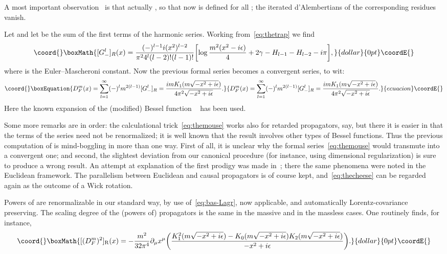 \documentclass[a4paper,12pt]{article}
\renewcommand{\a}{\alpha}          %
\providecommand{\del}{\partial}        %
\providecommand{\dl}{\delta}           %
\providecommand{\eps}{\epsilon}        %
\providecommand{\ga}{\gamma}           %
\providecommand{\7}{\dagger}           %
\theoremstyle{plain}
\theoremstyle{definition}
\begin{document}
A most important observation~\cite{ThreeFromBA} is that actually
\myHighlight{$\square^l[G^l_-]_{\rm R}=\dl$}\coordHE{}, so that now \myHighlight{$\square^\a$}\coordHE{} is defined
for all \myHighlight{$\a$}\coordHE{}; the iterated d'Alembertians of the corresponding
residues vanish.

Let \coordHE{} and let \coordHE{} be the sum of the \coordHE{} first terms of the
harmonic series. Working from~\eqref{eq:thetrap} we find
$$\coord{}\boxMath{
[G^l_-]_R(x) = \frac{(-)^{l-1}i(x^2)^{l-2}}{\pi^2 4^l(l-2)!(l-1)!}
\biggl[\log\frac{m^2(x^2-i\eps)}{4} + 2\ga -
H_{l-1} -  H_{l-2} - i\pi\biggr],
}{dollar}{0pt}\coordE{}$$
where \myHighlight{$\ga$}\coordHE{} is the Euler--Mascheroni constant. Now the previous formal
series becomes a convergent series, to wit:
\begin{equation}\coord{}\boxEquation{
D^m_F(x) = \sum_{l=1}^\infty(-)^lm^{2(l-1)}[G^l_-]_R =
\frac{imK_1(m\sqrt{-x^2+i\eps})}{4\pi^2\sqrt{-x^2+i\eps}}.
\label{eq:thecheese}
}{
D^m_F(x) = \sum_{l=1}^\infty(-)^lm^{2(l-1)}[G^l_-]_R =
\frac{imK_1(m\sqrt{-x^2+i\eps})}{4\pi^2\sqrt{-x^2+i\eps}}.
}{ecuacion}\coordE{}\end{equation}
Here the known expansion of the (modified) Bessel function
\coordHE{}~\cite{AS} has been used.

Some more remarks are in order: the calculational
trick~\eqref{eq:themouse} works also for retarded propagators, say,
but there it is easier in that the terms of the series need not be
renormalized; it is well known that the result involves other types of
Bessel functions. Thus the previous computation of \coordHE{} is
mind-boggling in more than one way. First of all, it is unclear
why the formal series~\eqref{eq:themouse} would transmute into a
convergent one; and second, the slightest deviation from our canonical
procedure (for instance, using dimensional regularization) is sure to
produce a wrong result. An attempt at explanation of the first prodigy
was made in~\cite{Natural}; there the same phenomena were noted in the
Euclidean framework. The parallelism between Euclidean and causal
propagators is of course kept, and~\eqref{eq:thecheese} can be
regarded again as the outcome of a Wick rotation.

\smallskip

Powers of \coordHE{} are renormalizable in our standard way, by use
of~\eqref{eq:bas-Lagr}, now applicable, and automatically
Lorentz-covariance preserving. The scaling degree of the (powers of)
propagators is the same in the massive and in the massless cases. One
routinely finds, for instance,
$$\coord{}\boxMath{
[(D^m_F)^2]_{\rm R}(x) =
-\frac{m^2}{32\pi^4} \del_\mu x^\mu \biggl(
\frac{K_1^2(m\sqrt{-x^2+i\eps})-K_0(m\sqrt{-x^2+i\eps})
K_2(m\sqrt{-x^2+i\eps})}{-x^2+i\eps} \biggr).
}{dollar}{0pt}\coordE{}$$
\end{document}
